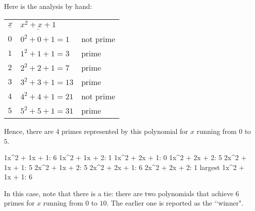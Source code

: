 Here is the analysis by hand:
\begin{longtable}{lll}	
$\underline{x}$ & \hspace{2cm}$\underline{x^2+x+1}$ & \hspace{2cm} \\
$0$ & \hspace{2cm}$0^2+0+1 = 1$ & \hspace{2cm}not prime \\
$1$ & \hspace{2cm}$1^2+1+1 = 3$ & \hspace{2cm}prime \\
$2$ & \hspace{2cm}$2^2+2+1 = 7$ & \hspace{2cm}prime \\
$3$ & \hspace{2cm}$3^2+3+1 = 13$ & \hspace{2cm}prime \\
$4$ & \hspace{2cm}$4^2+4+1 = 21$ & \hspace{2cm}not prime \\
$5$ & \hspace{2cm}$5^2+5+1 = 31$ & \hspace{2cm}prime \\
\end{longtable}
Hence, there are $4$ primes represented by this polynomial for $x$ running
from $0$ to $5$.

\resett
\nextt
\begin{console}[frame=single, commandchars=\\\{\}]
    1x^2 +     1x +     1:     6
    1x^2 +     1x +     2:     1
    1x^2 +     2x +     1:     0
    1x^2 +     2x +     2:     5
    2x^2 +     1x +     1:     5
    2x^2 +     1x +     2:     5
    2x^2 +     2x +     1:     6
    2x^2 +     2x +     2:     1
largest
    1x^2 +     1x +     1:     6
\end{console}
In this case, note that there is a tie: there are two polynomials that achieve
$6$ primes for $x$ running from $0$ to $10$. The earlier one is reported as the
\lq\lq winner".

